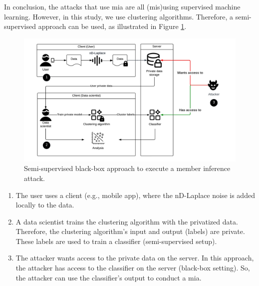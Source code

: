 In conclusion, the attacks that use \gls{mia} are all (mis)using supervised machine learning.
However, in this study, we use clustering algorithms.
Therefore, a semi-supervised approach can be used, as illustrated in Figure \ref{figure:MIA-semi-supervised}.
\newpage
\begin{figure}[h]
  \includegraphics[width=1\textwidth]{TheorethicalFramework/Differential privacy/master-thesis-MIA.png}
  \caption{Semi-supervised black-box approach to execute a member inference attack.}
  \label{figure:MIA-semi-supervised}
\end{figure}

\begin{enumerate}
  \item The user uses a client (e.g., mobile app), where the nD-Laplace noise is added locally to the data.
  \item A data scientist trains the clustering algorithm with the privatized data.
        Therefore, the clustering algorithm's input and output (labels) are private.
        These labels are used to train a classifier (semi-supervised setup).
  \item The attacker wants access to the private data on the server.
        In this approach, the attacker has access to the classifier on the server (black-box setting).
        So, the attacker can use the classifier's output to conduct a \gls{mia}.
\end{enumerate}
